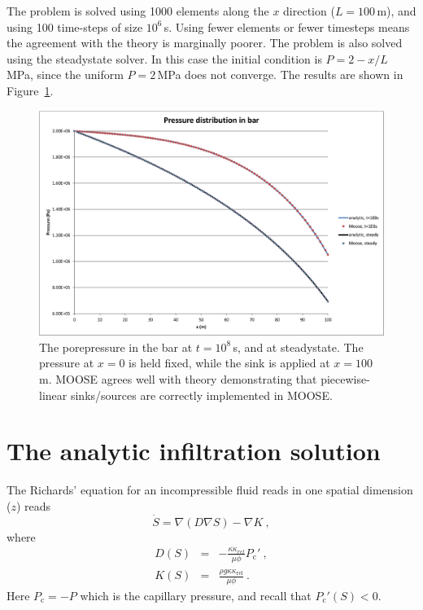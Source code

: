 \documentclass[]{scrreprt}
\begin{document}
The problem is solved using 1000 elements along the $x$
direction ($L=100$\,m), and using 100 time-steps of size $10^6$\,s.
Using fewer elements or fewer timesteps means the agreement with the
theory is marginally poorer.  The problem is also solved using the
steadystate solver.  In this case the initial condition is
$P=2-x/L$\,MPa, since the uniform $P=2$\,MPa does not converge.  The
results are shown in Figure~\ref{nc.fig}.

\begin{figure}[htb]
\begin{center}
\includegraphics[width=17cm]{nc.eps}
\caption{The porepressure in the bar at $t=10^{8}$\,s, and at
  steadystate.  The pressure at $x=0$ is held fixed, while the sink is
  applied at $x=100$\,m.  MOOSE agrees well with theory demonstrating
  that piecewise-linear sinks/sources are correctly implemented in MOOSE.}
\label{nc.fig}
\end{center}
\end{figure}



\chapter{The analytic infiltration solution}
\label{bw}

The Richards' equation for an incompressible fluid reads in one
spatial dimension ($z$) reads 
\begin{equation}
\dot{S} = \nabla \left(D \nabla S\right) - \nabla K \ ,
\end{equation}
where
\begin{eqnarray}
D(S) & = & -\frac{\kappa \kappa_{rel}}{\mu\phi}P_{\mathrm{c}}' \ ,
\\
K(S) & = &\frac{\rho g \kappa\kappa_{\mathrm{rel}}}{\mu\phi} \ .
\end{eqnarray}
Here $P_{\mathrm{c}} = -P$ which is the capillary pressure, and recall
that $P_{\mathrm{c}}'(S)<0$.
\end{document}
